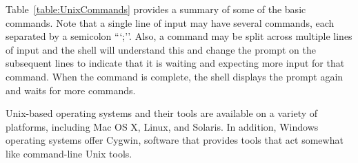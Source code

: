 Table~\ref{table:UnixCommands} provides a summary of some of the
basic commands.  Note that a single line of input may have several commands,
  each separated by a semicolon ```;''.  Also, a command may be split across
  multiple lines of input and the shell will understand this and
  change the prompt on the subsequent lines to indicate that it is
  waiting and expecting more input for that command. When the command
is complete, the shell displays the prompt again and waits for more
commands.


Unix-based operating systems and their tools are available on a variety of platforms,
including Mac OS X, Linux, and Solaris. In addition, Windows operating
systems offer Cygwin, software that provides tools that act somewhat like command-line Unix tools.



